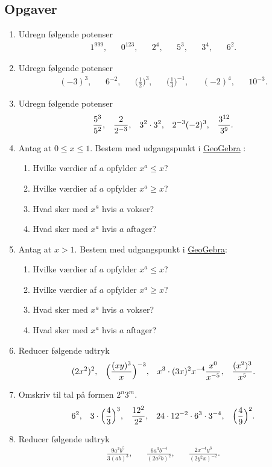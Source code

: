 \subsection{Opgaver}

\begin{enumerate}
\item Udregn følgende potenser
\begin{align*}
1^{999},&&0^{123},&& 2^4,&&5^3,&& 3^4,&& 6^2.
\end{align*}
\item Udregn følgende potenser
\begin{align*}
(-3)^3,&& 6^{-2},&& \Big(\frac{1}{2}\Big)^{3},&& \Big(\frac{1}{3}\Big)^{-1},&& (-2)^4,&& 10^{-3}.
\end{align*}
\item Udregn følgende potenser
\begin{align*}
\frac{5^3}{5^2},&& \frac{2}{2^{-3}},&& 3^2\cdot 3^2,&& 2^{-3}(-2)^3,&& \frac{3^{12}}{3^9}.
\end{align*}
\item Antag at $0\leq x\leq1$. Bestem med udgangspunkt i \href{https://www.geogebra.org/m/Kdr3GHkr}{GeoGebra} :
\begin{enumerate}
\item Hvilke værdier af $a$ opfylder $x^a\leq x$?
\item Hvilke værdier af $a$ opfylder $x^a \geq x$?
\item Hvad sker med $x^a$ hvis $a$ vokser?
\item Hvad sker med $x^a$ hvis $a$ aftager?
\end{enumerate}
\item Antag at $x>1$. Bestem med udgangspunkt i \href{https://www.geogebra.org/m/Kdr3GHkr}{GeoGebra}:
\begin{enumerate}
\item Hvilke værdier af $a$ opfylder $x^a\leq x$?
\item Hvilke værdier af $a$ opfylder $x^a \geq x$?
\item Hvad sker med $x^a$ hvis $a$ vokser?
\item Hvad sker med $x^a$ hvis $a$ aftager?
\end{enumerate}
 
\item Reducer følgende udtryk
\begin{align*}
(2x^2)^2,&& \Big(\frac{(xy)^{3}}{x}\Big)^{-3},&& x^3\cdot (3x)^2x^{-4} \frac{x^0}{x^{-5}},&& \frac{(x^2)^3}{x^5}.
\end{align*}
\item Omskriv til tal på formen $2^n3^m$.
\begin{align*}
6^2,&& 3\cdot \Big(\frac{4}{3}\Big)^3,&& \frac{12^2}{2^2},&& 24\cdot 12^{-2}\cdot 6^3\cdot 3^{-4},&& \Big(\frac{4}{9}\Big)^{2}.
\end{align*}
\item Reducer følgende udtryk
\begin{align*}
\frac{9a^2b^5}{3(ab)^3},&& \frac{6a^3b^{-4}}{(2a^2b)^2},&& \frac{2x^{-4}y^3}{(2y^2x)^{-2}}.
\end{align*}


\end{enumerate}
